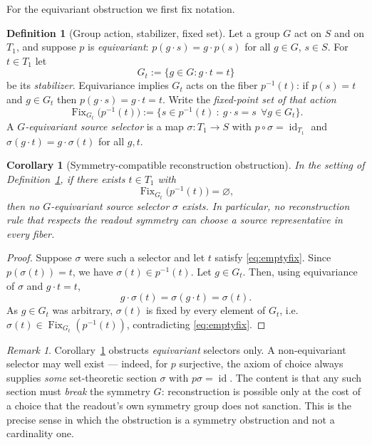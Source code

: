 \documentclass[11pt,reqno]{amsart}
\theoremstyle{plain}
\newtheorem{corollary}[theorem]{Corollary}
\theoremstyle{definition}
\newtheorem{definition}[theorem]{Definition}
\theoremstyle{remark}
\newtheorem{remark}[theorem]{Remark}
\DeclareMathOperator{\Fix}{Fix}
\DeclareMathOperator{\id}{id}
\begin{document}
For the equivariant obstruction we first fix notation.

\begin{definition}[Group action, stabilizer, fixed set]\label{def:equivariant}
Let a group $G$ act on $S$ and on $T_1$, and suppose $p$ is \emph{equivariant}: $p(g\cdot s)=g\cdot p(s)$ for all $g\in G$, $s\in S$. For $t\in T_1$ let
\[
G_t:=\{g\in G: g\cdot t=t\}
\]
be its \emph{stabilizer}. Equivariance implies $G_t$ acts on the fiber $p^{-1}(t)$: if $p(s)=t$ and $g\in G_t$ then $p(g\cdot s)=g\cdot t=t$. Write the \emph{fixed-point set of that action}
\[
\Fix_{G_t}\bigl(p^{-1}(t)\bigr):=\bigl\{s\in p^{-1}(t)\ :\ g\cdot s=s\ \ \forall g\in G_t\bigr\}.
\]
A \emph{$G$-equivariant source selector} is a map $\sigma\colon T_1\to S$ with $p\circ\sigma=\id_{T_1}$ and $\sigma(g\cdot t)=g\cdot\sigma(t)$ for all $g,t$.
\end{definition}

\begin{corollary}[Symmetry-compatible reconstruction obstruction]\label{cor:equivariant}
In the setting of Definition~\ref{def:equivariant}, if there exists $t\in T_1$ with
\begin{equation}\label{eq:emptyfix}
\Fix_{G_t}\bigl(p^{-1}(t)\bigr)=\varnothing,
\end{equation}
then \emph{no} $G$-equivariant source selector $\sigma$ exists. In particular, no reconstruction rule that respects the readout symmetry can choose a source representative in every fiber.
\end{corollary}

\begin{proof}
Suppose $\sigma$ were such a selector and let $t$ satisfy \eqref{eq:emptyfix}. Since $p(\sigma(t))=t$, we have $\sigma(t)\in p^{-1}(t)$. Let $g\in G_t$. Then, using equivariance of $\sigma$ and $g\cdot t=t$,
\[
g\cdot\sigma(t)=\sigma(g\cdot t)=\sigma(t).
\]
As $g\in G_t$ was arbitrary, $\sigma(t)$ is fixed by every element of $G_t$, i.e.\ $\sigma(t)\in\Fix_{G_t}(p^{-1}(t))$, contradicting \eqref{eq:emptyfix}.
\end{proof}

\begin{remark}\label{rem:equivariantscope}
Corollary~\ref{cor:equivariant} obstructs \emph{equivariant} selectors only. A non-equivariant selector may well exist --- indeed, for $p$ surjective, the axiom of choice always supplies \emph{some} set-theoretic section $\sigma$ with $p\sigma=\id$. The content is that any such section must \emph{break} the symmetry $G$: reconstruction is possible only at the cost of a choice that the readout's own symmetry group does not sanction. This is the precise sense in which the obstruction is a symmetry obstruction and not a cardinality one.
\end{remark}
\end{document}
